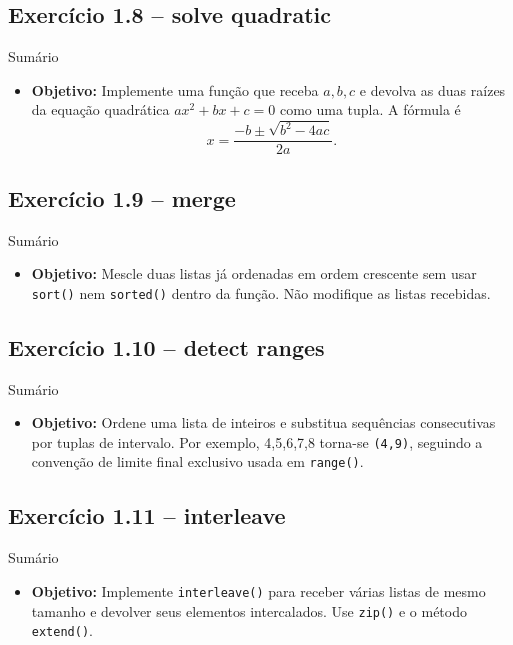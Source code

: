 \documentclass[11pt,a4paper]{article}
\begin{document}
\subsection*{Exercício 1.8 -- solve quadratic}
\begin{exercicio}{Sumário}
\begin{itemize}
    \item \textbf{Objetivo:} Implemente uma função que receba \(a,b,c\) e devolva as duas raízes da equação quadrática \(ax^2+bx+c=0\) como uma tupla. A fórmula é
    \[ x=\frac{-b\pm\sqrt{b^2-4ac}}{2a}. \]
\end{itemize}
\end{exercicio}

\subsection*{Exercício 1.9 -- merge}
\begin{exercicio}{Sumário}
\begin{itemize}
    \item \textbf{Objetivo:} Mescle duas listas já ordenadas em ordem crescente sem usar \texttt{sort()} nem \texttt{sorted()} dentro da função. Não modifique as listas recebidas.
\end{itemize}
\end{exercicio}

\subsection*{Exercício 1.10 -- detect ranges}
\begin{exercicio}{Sumário}
\begin{itemize}
    \item \textbf{Objetivo:} Ordene uma lista de inteiros e substitua sequências consecutivas por tuplas de intervalo. Por exemplo, 4,5,6,7,8 torna-se \texttt{(4,9)}, seguindo a convenção de limite final exclusivo usada em \texttt{range()}.
\end{itemize}
\end{exercicio}

\subsection*{Exercício 1.11 -- interleave}
\begin{exercicio}{Sumário}
\begin{itemize}
    \item \textbf{Objetivo:} Implemente \texttt{interleave()} para receber várias listas de mesmo tamanho e devolver seus elementos intercalados. Use \texttt{zip()} e o método \texttt{extend()}.
\end{itemize}
\end{exercicio}
\end{document}

